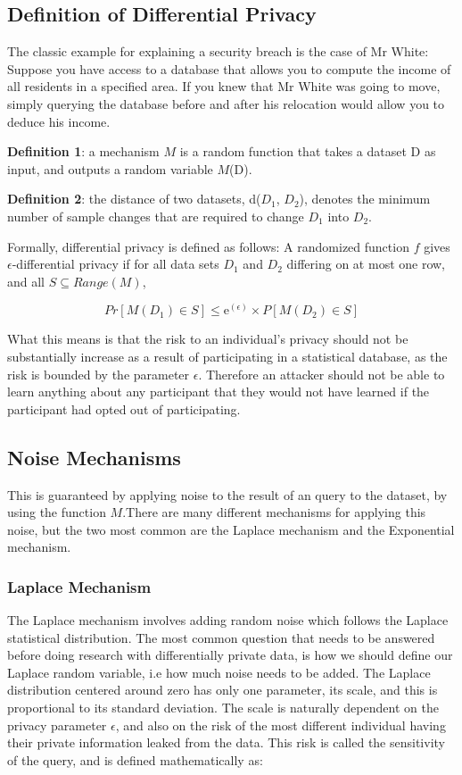 \subsection{Definition of Differential Privacy}
The classic example for explaining a security breach is the case of Mr White: Suppose you have access to a database that allows you to compute the income of all residents in a specified area. If you knew that Mr White was going to move, simply querying the database before and after his relocation would allow you to deduce his income. 

\textbf{Definition 1}: a mechanism $M$ is a random function that takes a dataset D as input, and outputs a random variable $M$(D).

\textbf{Definition 2}: the distance of two datasets, d($D_1$, $D_2$), denotes the minimum number of sample changes that are required to change $D_1$ into $D_2$.

Formally, differential privacy is defined as follows:
A randomized function $f$ gives $\epsilon$-differential privacy if for all data sets $D_1$ and $D_2$ differing on at most one row, and all $S\subseteq Range(M)$,

 $$Pr[M(D_1)\in S]\leq \mathrm{e}^{(\epsilon)}\times P[M(D_2)\in S]$$
 
What this means is that the risk to an individual's privacy should not be substantially increase as a result of participating in a statistical database, as the risk is bounded by the parameter $\epsilon$. Therefore an attacker should not be able to learn anything about any participant that they would not have learned if the participant had opted out of participating.


\subsection{Noise Mechanisms}
This is guaranteed by applying noise to the result of an query to the dataset, by using the function $M$.There are many different mechanisms for applying this noise, but the two most common are the Laplace mechanism and the Exponential mechanism. 

\subsubsection{Laplace Mechanism}
The Laplace mechanism involves adding random noise which follows the Laplace statistical distribution. The most common question that needs to be answered before doing research with differentially private data, is how we should define our Laplace random variable, i.e how much noise needs to be added. The Laplace distribution centered around zero has only one parameter, its scale, and this is proportional to its standard deviation. The scale is naturally dependent on the privacy parameter $\epsilon$, and also on the risk of the most different individual having their private information leaked from the data. This risk is called the sensitivity of the query, and is defined mathematically as:

